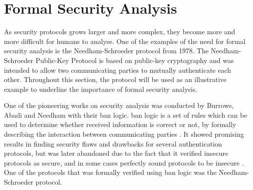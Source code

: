 






\section{Formal Security Analysis} 


As security protocols grows larger and more complex, they become more and more difficult for humans to analyse. One of the examples of the need for formal security analysis is the Needham-Schroeder protocol \cite{Needham:1978} from 1978. The Needham-Schroeder Public-Key Protocol is based on public-key cryptography and was intended to allow two communicating parties to mutually authenticate each other. Throughout this section, the protocol will be used as an illustrative example to underline the importance of formal security analysis.

One of the pioneering works on security analysis was conducted by Burrows, Abadi and Needham with their \gls{ban} logic. \gls{ban} logic is a set of rules which can be used to determine whether received information is correct or not, by formally describing the interaction between communicating parties \cite{burrows1989logic}. It showed promising results in finding security flaws and drawbacks for several authentication protocols, but was later abandoned due to the fact that it verified insecure protocols as secure, and in some cases perfectly sound protocols to be insecure \cite{boyd1993}. One of the protocols that was formally verified using \gls{ban} logic was the Needham-Schroeder protocol.

